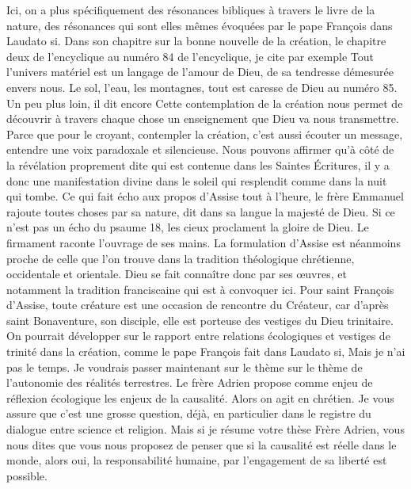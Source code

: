 Ici, on a plus spécifiquement des résonances bibliques à travers le livre de la nature, des résonances qui sont elles mêmes évoquées par le pape François dans Laudato si. Dans son chapitre sur la bonne nouvelle de la création, le chapitre deux de l'encyclique au numéro 84 de l'encyclique, je cite par exemple Tout l'univers matériel est un langage de l'amour de Dieu, de sa tendresse démesurée envers nous.
Le sol, l'eau, les montagnes, tout est caresse de Dieu au numéro 85. Un peu plus loin, il dit encore Cette contemplation de la création nous permet de découvrir à travers chaque chose un enseignement que Dieu va nous transmettre. Parce que pour le croyant, contempler la création, c'est aussi écouter un message, entendre une voix paradoxale et silencieuse. Nous pouvons affirmer qu'à côté de la révélation proprement dite qui est contenue dans les Saintes Écritures, il y a donc une manifestation divine dans le soleil qui resplendit comme dans la nuit qui tombe.
Ce qui fait écho aux propos d'Assise tout à l'heure, le frère Emmanuel rajoute toutes choses par sa nature, dit dans sa langue la majesté de Dieu. Si ce n'est pas un écho du psaume 18, les cieux proclament la gloire de Dieu. Le firmament raconte l'ouvrage de ses mains. La formulation d'Assise est néanmoins proche de celle que l'on trouve dans la tradition théologique chrétienne, occidentale et orientale.
Dieu se fait connaître donc par ses œuvres, et notamment la tradition franciscaine qui est à convoquer ici. Pour saint François d'Assise, toute créature est une occasion de rencontre du Créateur, car d'après saint Bonaventure, son disciple, elle est porteuse des vestiges du Dieu trinitaire. On pourrait développer sur le rapport entre relations écologiques et vestiges de trinité dans la création, comme le pape François fait dans Laudato si, Mais je n'ai pas le temps.
Je voudrais passer maintenant sur le thème sur le thème de l'autonomie des réalités terrestres. Le frère Adrien propose comme enjeu de réflexion écologique les enjeux de la causalité. Alors on agit en chrétien. Je vous assure que c'est une grosse question, déjà, en particulier dans le registre du dialogue entre science et religion. Mais si je résume votre thèse Frère Adrien, vous nous dites que vous nous proposez de penser que si la causalité est réelle dans le monde, alors oui, la responsabilité humaine, par l'engagement de sa liberté est possible.

